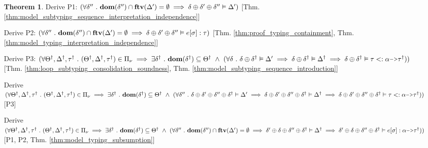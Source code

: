 \documentclass[acmsmall]{acmart}
\theoremstyle{definition}
\newtheorem{theorem}{Theorem}[section]
\begin{document}
\begin{theorem}
  \item \I\I \N Derive P1: $(
    \forall \delta'' \ .\  \textbf{dom}(\delta'') \cap \textbf{ftv}(\Delta') = \emptyset \implies \delta \oplus \delta' \oplus \delta'' \vDash \Delta'
  )$ [Thm. \ref{thm:model_subtyping_sequence_interpretation_independence}]

  \item \I\I \N Derive P2: $(
    \forall \delta'' \ .\  \textbf{dom}(\delta'') \cap \textbf{ftv}(\Delta') = \emptyset \implies \delta \oplus \delta' \oplus \delta'' \vDash e[\sigma] : \tau
  )$ [Thm. \ref{thm:proof_typing_containment},
      Thm. \ref{thm:model_typing_interpretation_independence}]

  \item \I\I \N Derive P3: $(
    \forall \Theta^\dagger, \Delta^\dagger, \tau^\dagger \qua 
    (\Theta^\dagger, \Delta^\dagger, \tau^\dagger) \in \Pi_\nu \implies
    \exists \delta^\dagger \qua \textbf{dom}(\delta^\dagger) \subseteq \Theta^\dagger \up 
    (
    \forall \delta \qua
    \delta \oplus \delta^\dagger \satisfies \Delta' \implies
    \delta \oplus \delta^\dagger \satisfies \Delta^\dagger \implies
    \delta \oplus \delta^\dagger \satisfies \tau \subtypes \alpha \J{->} \tau^\dagger
    )
  )$ [Thm. \ref{thm:loop_subtyping_consolidation_soundness}, Thm. \ref{thm:model_subtyping_sequence_introduction}]

  \item \I\I \N Derive $(
    \forall \Theta^\dagger, \Delta^\dagger, \tau^\dagger \qua 
    (\Theta^\dagger, \Delta^\dagger, \tau^\dagger) \in \Pi_\nu \implies
    \exists \delta^\dagger \qua \textbf{dom}(\delta^\dagger) \subseteq \Theta^\dagger \up 
    (
    \forall \delta'' \qua
    \delta \oplus \delta' \oplus \delta'' \oplus \delta^\dagger \satisfies \Delta' \implies
    \delta \oplus \delta' \oplus \delta'' \oplus \delta^\dagger \satisfies \Delta^\dagger \implies
    \delta \oplus \delta' \oplus \delta'' \oplus \delta^\dagger \satisfies \tau \subtypes \alpha \J{->} \tau^\dagger
    )
  )$ [P3]

  \item \I\I \N Derive $(
    \forall \Theta^\dagger, \Delta^\dagger, \tau^\dagger \qua 
    (\Theta^\dagger, \Delta^\dagger, \tau^\dagger) \in \Pi_\nu \implies
    \exists \delta^\dagger \qua \textbf{dom}(\delta^\dagger) \subseteq \Theta^\dagger \up 
    (
    \forall \delta'' \qua
    \textbf{dom}(\delta'') \cap \textbf{ftv}(\Delta') = \emptyset \implies
    \delta' \oplus \delta \oplus \delta'' \oplus \delta^\dagger \satisfies \Delta^\dagger \implies
    \delta' \oplus \delta \oplus \delta'' \oplus \delta^\dagger \satisfies e[\sigma] \hastype \alpha \J{->} \tau^\dagger
    )
  )$ [P1, P2, Thm. \ref{thm:model_typing_subsumption}]


\end{theorem}
\end{document}
